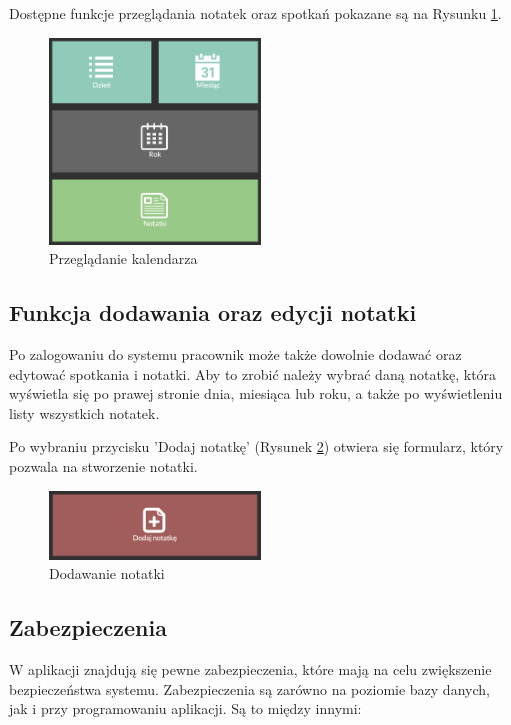 \documentclass[eng,printmode,openany,oneside]{mgr}
\begin{document}
Dostępne funkcje przeglądania notatek oraz spotkań pokazane są na Rysunku \ref{fig:7}.
	
\begin{figure}[H]
	\centering
	\includegraphics[width=0.5\textwidth]{przeglad}
	\caption{Przeglądanie kalendarza}
	\label{fig:7}
\end{figure}


	
	
	\subsection*{Funkcja dodawania oraz edycji notatki}
	Po zalogowaniu do systemu pracownik może także dowolnie dodawać oraz edytować spotkania i notatki. Aby to zrobić należy wybrać daną notatkę, która wyświetla się po prawej stronie dnia, miesiąca lub roku, a także po wyświetleniu listy wszystkich notatek.

Po wybraniu przycisku 'Dodaj notatkę' (Rysunek \ref{fig:8}) otwiera się formularz, który pozwala na stworzenie notatki.
	
\begin{figure}[H]
	\centering
	\includegraphics[width=0.5\textwidth]{dodaj_notatke_edycja}
	\caption{Dodawanie notatki}
	\label{fig:8}
\end{figure}





\subsection*{Zabezpieczenia}

W aplikacji znajdują się pewne zabezpieczenia, które mają na celu zwiększenie bezpieczeństwa systemu. Zabezpieczenia są zarówno na poziomie bazy danych, jak i przy programowaniu aplikacji. Są to między innymi:
\end{document}
